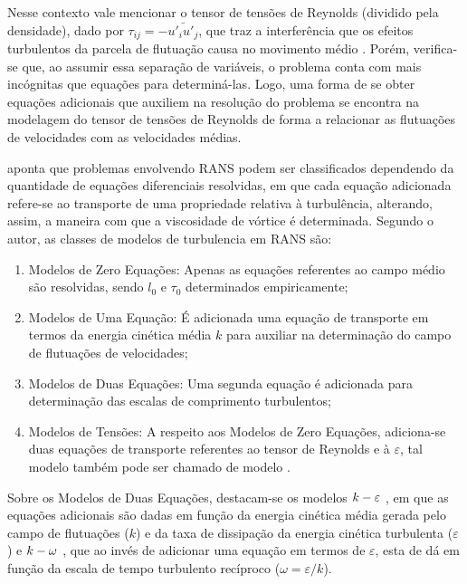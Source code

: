 \documentclass[_ArquivoPrincipal.tex]{subfiles}
\begin{document}
Nesse contexto vale mencionar o tensor de tensões de Reynolds (dividido pela densidade), dado por $\tau_{ij}=-\bar{u'_iu'_j}$, que traz a interferência que os efeitos turbulentos da parcela de flutuação causa no movimento médio \cite{chou1945velocity,alfonsi2009reynolds}. Porém, verifica-se que, ao assumir essa separação de variáveis, o problema conta com mais incógnitas que equações para determiná-las. Logo, uma forma de se obter equações adicionais que auxiliem na resolução do problema se encontra na modelagem do tensor de tensões de Reynolds de forma a relacionar as flutuações de velocidades com as velocidades médias.

 aponta que problemas envolvendo RANS podem ser classificados dependendo da quantidade de equações diferenciais resolvidas, em que cada equação adicionada refere-se ao transporte de uma propriedade relativa à turbulência, alterando, assim, a maneira com que a viscosidade de vórtice é determinada. Segundo o autor, as classes de modelos de turbulencia em RANS são:

\begin{enumerate}[label=\alph*.]
    \item Modelos de Zero Equações: Apenas as equações referentes ao campo médio são resolvidas, sendo $l_0$ e $\tau_0$ determinados empiricamente;
    \item Modelos de Uma Equação: É adicionada uma equação de transporte em termos da energia cinética média $k$ para auxiliar na determinação do campo de flutuações de velocidades;
    \item Modelos de Duas Equações: Uma segunda equação é adicionada para determinação das escalas de comprimento turbulentos;
    \item Modelos de Tensões: A respeito aos Modelos de Zero Equações, adiciona-se duas equações de transporte referentes ao tensor de Reynolds e à $\varepsilon$, tal modelo também pode ser chamado de modelo \te.
\end{enumerate}

Sobre os Modelos de Duas Equações, destacam-se os modelos $k-\varepsilon$ \cite{haakansson2012experimental,davidson2014pans,parente2011improved}, em que as equações adicionais são dadas em função da energia cinética média gerada pelo campo de flutuações ($k$) e da taxa de dissipação da energia cinética turbulenta ($\varepsilon$) e $k-\omega$ \cite{larsen2018over,bassi2005discontinuous}, que ao invés de adicionar uma equação em termos de $\varepsilon$, esta de dá em função da escala de tempo turbulento recíproco ($\omega=\varepsilon/k$).
\end{document}
